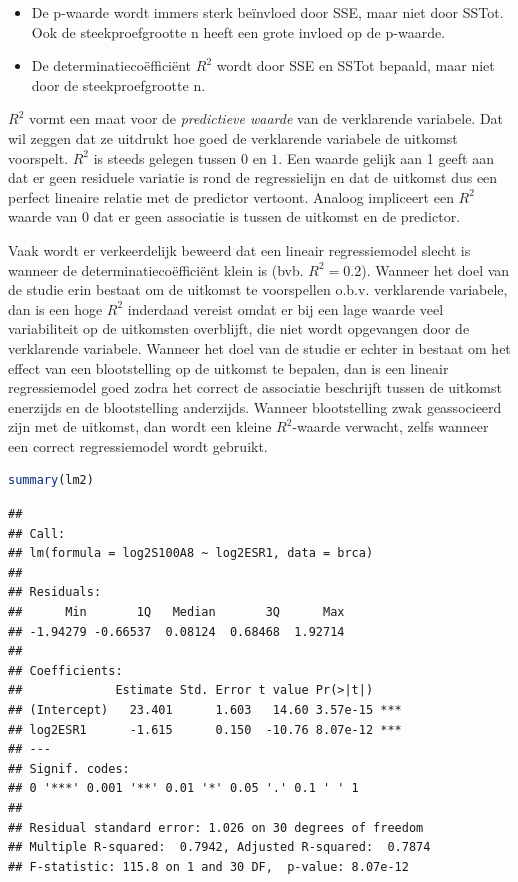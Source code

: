 \documentclass[
  12pt,dutch,coursenotes]{book}
\providecommand{\tightlist}{%
  \setlength{\itemsep}{0pt}\setlength{\parskip}{0pt}}
\begin{document}
\begin{itemize}
\tightlist
\item
  De p-waarde wordt immers sterk beïnvloed door SSE, maar niet door SSTot. Ook de steekproefgrootte n heeft een grote invloed op de p-waarde.
\item
  De determinatiecoëfficiënt \(R^2\) wordt door SSE en SSTot bepaald, maar niet door de steekproefgrootte n.
\end{itemize}

\(R^2\) vormt een maat voor de \emph{predictieve waarde} van de verklarende variabele.
Dat wil zeggen dat ze uitdrukt hoe goed de verklarende variabele de uitkomst voorspelt.
\(R^2\) is steeds gelegen tussen \(0\) en \(1\). Een waarde gelijk aan 1 geeft aan dat er geen residuele variatie is rond de regressielijn en dat de
uitkomst dus een perfect lineaire relatie met de predictor vertoont. Analoog impliceert een \(R^2\) waarde van 0 dat er geen associatie is tussen de uitkomst en de predictor.

Vaak wordt er verkeerdelijk beweerd dat een lineair regressiemodel slecht is wanneer de determinatiecoëfficiënt klein is (bvb. \(R^2=0.2\)).
Wanneer het doel van de studie erin bestaat om de uitkomst te voorspellen o.b.v. verklarende variabele, dan is een hoge \(R^2\) inderdaad vereist omdat er bij een lage waarde veel variabiliteit op de uitkomsten overblijft, die niet wordt opgevangen door de verklarende variabele. Wanneer het doel van de studie er echter in bestaat om het effect van een blootstelling op de uitkomst te bepalen, dan is een lineair regressiemodel goed zodra het correct de associatie beschrijft tussen de uitkomst enerzijds en de blootstelling anderzijds.
Wanneer blootstelling zwak geassocieerd zijn met de uitkomst, dan wordt een kleine \(R^2\)-waarde verwacht, zelfs wanneer een correct regressiemodel wordt gebruikt.

\begin{lstlisting}[language=R]
summary(lm2)
\end{lstlisting}

\begin{lstlisting}
## 
## Call:
## lm(formula = log2S100A8 ~ log2ESR1, data = brca)
## 
## Residuals:
##      Min       1Q   Median       3Q      Max 
## -1.94279 -0.66537  0.08124  0.68468  1.92714 
## 
## Coefficients:
##             Estimate Std. Error t value Pr(>|t|)    
## (Intercept)   23.401      1.603   14.60 3.57e-15 ***
## log2ESR1      -1.615      0.150  -10.76 8.07e-12 ***
## ---
## Signif. codes:  
## 0 '***' 0.001 '**' 0.01 '*' 0.05 '.' 0.1 ' ' 1
## 
## Residual standard error: 1.026 on 30 degrees of freedom
## Multiple R-squared:  0.7942, Adjusted R-squared:  0.7874 
## F-statistic: 115.8 on 1 and 30 DF,  p-value: 8.07e-12
\end{lstlisting}
\end{document}
